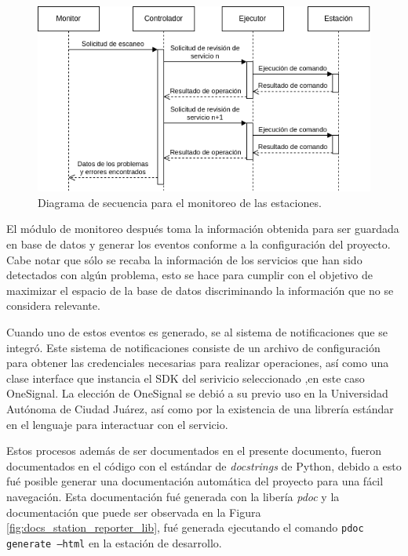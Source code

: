 \begin{figure}[!ht]
	\centering
	\includegraphics[width=0.9\linewidth]{images/diagrams/classes/monitoring_diagram.drawio.png}
	\caption{Diagrama de secuencia para el monitoreo de las estaciones.}
	\label{fig:diagrama_secuencia_de_monitoreo}
\end{figure}

El módulo de monitoreo después toma la información obtenida para ser guardada en base de datos y generar los eventos conforme a la configuración del proyecto. Cabe notar que sólo se recaba la información de los servicios que han sido detectados con algún problema, esto se hace para cumplir con el objetivo de maximizar el espacio de la base de datos discriminando la información que no se considera relevante.

Cuando uno de estos eventos es generado, se al sistema de notificaciones que se integró. Este sistema de notificaciones consiste de un archivo de configuración para obtener las credenciales necesarias para realizar operaciones, así como una clase interface que instancia el SDK del serivicio seleccionado ,en este caso OneSignal. La elección de OneSignal se debió a su previo uso en la Universidad Autónoma de Ciudad Juárez, así como por la existencia de una librería estándar en el lenguaje para interactuar con el servicio.

Estos procesos además de ser documentados en el presente documento, fueron documentados en el código con el estándar de \textit{docstrings} de Python, debido a esto fué posible generar una documentación automática del proyecto para una fácil navegación. Esta documentación fué generada con la libería \textit{pdoc} y la documentación que puede ser observada en la Figura \ref{fig:docs_station_reporter_lib}, fué generada ejecutando el comando \texttt{pdoc generate --html} en la estación de desarrollo.


